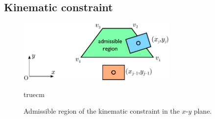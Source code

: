 \subsection{Kinematic constraint}

\begin{figure}
    \centering
    \includegraphics[width=0.7\textwidth]{figures/humanoids_kinconstr.pdf}
    \caption{Admissible region of the kinematic constraint in the $x$-$y$ plane.}
    \label{fig:FAPA:kinematic-constraint}
     truecm
\end{figure}

